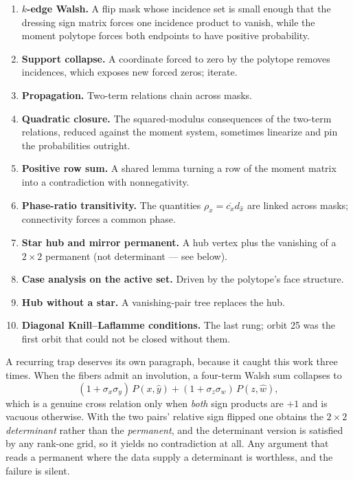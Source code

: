 \documentclass[11pt,a4paper]{article}
\theoremstyle{definition}
\begin{document}
\begin{enumerate}
\item \textbf{$k$-edge Walsh.} A flip mask whose incidence set is small enough
  that the dressing sign matrix forces one incidence product to vanish, while the
  moment polytope forces both endpoints to have positive probability.
\item \textbf{Support collapse.} A coordinate forced to zero by the polytope
  removes incidences, which exposes new forced zeros; iterate.
\item \textbf{Propagation.} Two-term relations chain across masks.
\item \textbf{Quadratic closure.} The squared-modulus consequences of the
  two-term relations, reduced against the moment system, sometimes linearize and
  pin the probabilities outright.
\item \textbf{Positive row sum.} A shared lemma turning a row of the moment
  matrix into a contradiction with nonnegativity.
\item \textbf{Phase-ratio transitivity.} The quantities
  $\rho_x = \overline{c_x} d_{\hat x}$ are linked across masks; connectivity
  forces a common phase.
\item \textbf{Star hub and mirror permanent.} A hub vertex plus the vanishing of
  a $2 \times 2$ permanent (not determinant --- see below).
\item \textbf{Case analysis on the active set.} Driven by the polytope's face
  structure.
\item \textbf{Hub without a star.} A vanishing-pair tree replaces the hub.
\item \textbf{Diagonal Knill--Laflamme conditions.} The last rung; orbit 25 was
  the first orbit that could not be closed without them.
\end{enumerate}

A recurring trap deserves its own paragraph, because it caught this work three
times. When the fibers admit an involution, a four-term Walsh sum collapses to
\[
  (1 + \sigma_x \sigma_y)\, P(x,\hat y) + (1 + \sigma_z \sigma_w)\, P(z,\hat w),
\]
which is a genuine cross relation only when \emph{both} sign products are $+1$
and is vacuous otherwise. With the two pairs' relative sign flipped one obtains
the $2 \times 2$ \emph{determinant} rather than the \emph{permanent}, and the
determinant version is satisfied by any rank-one grid, so it yields no
contradiction at all. Any argument that reads a permanent where the data supply a
determinant is worthless, and the failure is silent.
\end{document}
